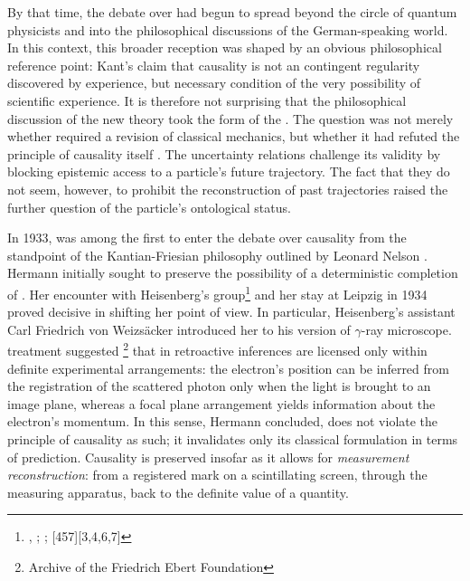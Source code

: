 \documentclass[final,12pt]{article}
\newcommand{\vW}{von Weizsäcker\xspace}
\begin{document}
By that time, the debate over \qm had begun to spread beyond the circle of quantum physicists and into the philosophical discussions of the German-speaking world. In this context, this broader reception was shaped by an obvious philosophical reference point: Kant's claim that causality is not an \apo contingent regularity discovered by experience, but \apr necessary condition of the very possibility of scientific experience. It is therefore not surprising that the philosophical discussion of the new theory took the form of the  \citep[2.VI.1]{Mehra2001a}. The question was not merely whether \qm required a revision of classical mechanics, but whether it had refuted the principle of causality itself \citep{Frank1932}. The uncertainty relations challenge its validity by blocking epistemic access to a particle's future trajectory. The fact that they do not seem, however, to prohibit the reconstruction of past trajectories raised the further question of the particle's ontological status.

In 1933, \citet{Hermann1933} was among the first to enter the debate over causality from the standpoint of the Kantian-Friesian philosophy outlined by Leonard Nelson \citep{Soler2017}. Hermann initially sought to preserve the possibility of a deterministic completion of \qm. Her encounter with Heisenberg's group\footnote{, ; ; [457][3,4,6,7]} and her stay at Leipzig in 1934 proved decisive in shifting her point of view. In particular, Heisenberg's assistant Carl Friedrich \vW introduced her to his version of  $\gamma$-ray microscope.  treatment suggested \footnote{Archive of the Friedrich Ebert Foundation} that in \qm retroactive inferences are licensed only within definite experimental arrangements: the electron's position can be inferred from the registration of the scattered photon only when the light is brought to an image plane, whereas a focal plane arrangement yields information about the electron's momentum. In this sense, Hermann concluded, \qm does not violate the principle of causality as such; it invalidates only its classical formulation in terms of prediction. Causality is preserved insofar as it allows for \emph{measurement reconstruction}: from a registered mark on a scintillating screen, through the measuring apparatus, back to the definite value of a quantity. 
\end{document}
